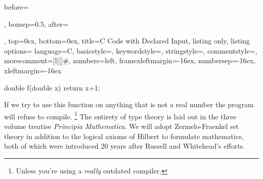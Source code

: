         \begin{tcblisting}{
            before=\par\vspace{2ex},
            boxsep=0.5\topsep,
            after=\par\vspace{2ex},
            top=0ex,
            bottom=0ex,
            title=C Code with Declared Input,
            listing only,
            listing options={
                language=C,
                basicstyle=\ttfamily,
                keywordstyle=\color{blue}\ttfamily,
                stringstyle=\color{red}\ttfamily,
                commentstyle=\color{green}\ttfamily,
                morecomment={[l][\color{magenta}]{\#}},
                numbers=left,
                framexleftmargin=-16ex,
                numbersep=-16ex,
                xleftmargin=-16ex
            }
        }
            double f(double x){
                return x+1;
            }
        \end{tcblisting}
        If we try to use this function on anything that is not a real number
        the program will refuse to compile.%
        \footnote{%
            Unless you're using a \textit{really} outdated compiler.
        }
        The entirety of type theory is laid out in the three volume
        treatise \textit{Principia Mathematica}. We will adopt Zermelo-Fraenkel
        set theory in addition to the logical
        axioms of Hilbert to formulate mathematics, both
        of which were introduced 20 years after Russell and Whitehead's efforts.
